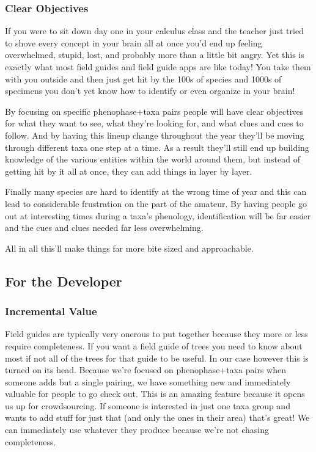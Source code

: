 \documentclass[10pt,a5paper]{book}
\begin{document}
\subsubsection{Clear Objectives}
If you were to sit down day one in your calculus class and the teacher just tried to shove every concept in your brain all at once you'd end up feeling overwhelmed, stupid, lost, and probably more than a little bit angry. Yet this is exactly what most field guides and field guide apps are like today! You take them with you outside and then just get hit by the 100s of species and 1000s of specimens you don't yet know how to identify or even organize in your brain! 

By focusing on specific phenophase+taxa pairs people will have clear objectives for what they want to see, what they're looking for, and what clues and cues to follow. And by having this lineup change throughout the year they'll be moving through different taxa one step at a time. As a result they'll still end up building knowledge of the various entities within the world around them, but instead of getting hit by it all at once, they can add things in layer by layer. 

Finally many species are hard to identify at the wrong time of year and this can lead to considerable frustration on the part of the amateur. By having people go out at interesting times during a taxa's phenology, identification will be far easier and the cues and clues needed far less overwhelming. 

All in all this'll make things far more bite sized and approachable. 

\subsection{For the Developer}
\subsubsection{Incremental Value}
Field guides are typically very onerous to put together because they more or less require completeness. If you want a field guide of trees you need to know about most if not all of the trees for that guide to be useful. In our case however this is turned on its head. Because we're focused on phenophase+taxa pairs when someone adds but a single pairing, we have something new and immediately valuable for people to go check out. This is an amazing feature because it opens us up for crowdsourcing. If someone is interested in just one taxa group and wants to add stuff for just that (and only the ones in their area) that's great! We can immediately use whatever they produce because we're not chasing completeness. 
\end{document}
